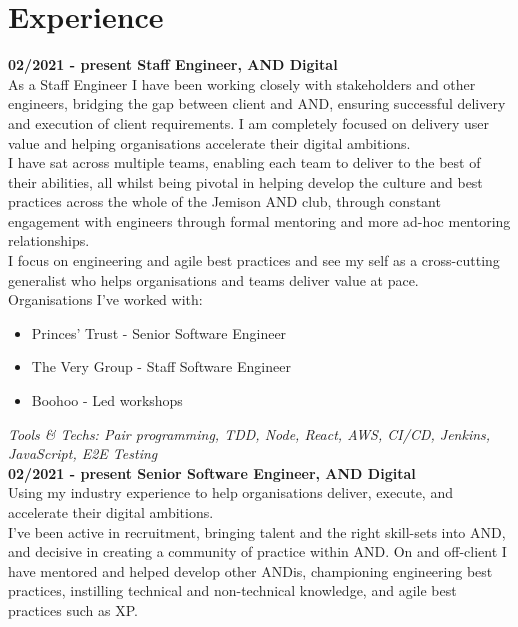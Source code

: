 \section{Experience}

\textbf{02/2021 - present \hspace{2.75em}Staff Engineer, AND Digital}\\

As a Staff Engineer I have been working closely with stakeholders and other engineers, bridging the gap between client and AND, ensuring successful delivery and execution of client requirements. I am completely focused on delivery user value and helping organisations accelerate their digital ambitions.\\

I have sat across multiple teams, enabling each team to deliver to the best of their abilities, all whilst being pivotal in helping develop the culture and best practices across the whole of the Jemison AND club, through constant engagement with engineers through formal mentoring and more ad-hoc mentoring relationships.\\ 

I focus on engineering and agile best practices and see my self as a cross-cutting generalist who helps organisations and teams deliver value at pace.\\

Organisations I've worked with:\\

\begin{itemize}
  \item Princes' Trust - Senior Software Engineer
  \item The Very Group - Staff Software Engineer
  \item Boohoo - Led workshops
\end{itemize}

\emph{Tools \& Techs: Pair programming, TDD, Node, React, AWS, CI/CD, Jenkins, JavaScript, E2E Testing}\\

\textbf{02/2021 - present \hspace{2.75em}Senior Software Engineer, AND Digital}\\

Using my industry experience to help organisations deliver, execute, and accelerate their digital ambitions.\\

I've been active in recruitment, bringing talent and the right skill-sets into AND, and decisive in creating a community of practice within AND. On and off-client I have mentored and helped develop other ANDis, championing engineering best practices, instilling technical and non-technical knowledge, and agile best practices such as XP.\\

